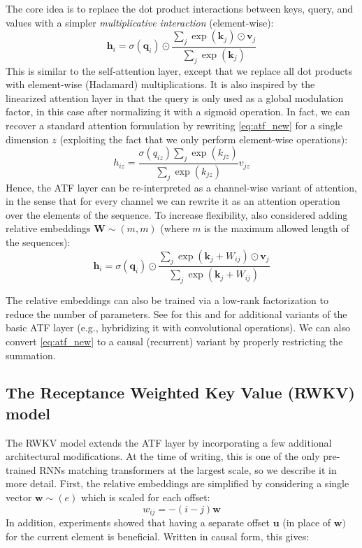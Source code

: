 The core idea is to replace the dot product interactions between keys, query, and values with a simpler \textit{multiplicative interaction} (element-wise):
%
\begin{equation}
\mathbf{h}_i=\sigma(\mathbf{q}_i) \odot\frac{\sum_j \exp\left(\mathbf{k}_j \right) \odot \mathbf{v}_j}{\sum_j\exp\left(\mathbf{k}_j \right)}
\label{eq:atf_new}
\end{equation}
%
This is similar to the self-attention layer, except that we replace all dot products with element-wise (Hadamard) multiplications. It is also inspired by the linearized attention layer in that the query is only used as a global modulation factor, in this case after normalizing it with a sigmoid operation. In fact, we can recover a standard attention formulation by rewriting \eqref{eq:atf_new} for a single dimension $z$ (exploiting the fact that we only perform element-wise operations):
%
$$
h_{iz}=\frac{\sigma(q_{iz})\sum_{j}\exp(k_{jz})}{\sum_j \exp(k_{jz})}v_{jz}
$$
%
Hence, the ATF layer can be re-interpreted as a channel-wise variant of attention, in the sense that for every channel we can rewrite it as an attention operation over the elements of the sequence. To increase flexibility, \cite{zhai2021attention} also considered adding relative embeddings $\mathbf{W} \sim (m, m)$ (where $m$ is the maximum allowed length of the sequences):
%
\begin{equation}\mathbf{h}_i=\sigma(\mathbf{q}_i) \odot\frac{\sum_j \exp\left(\mathbf{k}_j +W_{ij}\right) \odot \mathbf{v}_j}{\sum_j\exp\left(\mathbf{k}_j +W_{ij}\right)}\end{equation}

The relative embeddings can also be trained via a low-rank factorization to reduce the number of parameters. See \cite{zhai2021attention} for this and for additional variants of the basic ATF layer (e.g., hybridizing it with convolutional operations). We can also convert \eqref{eq:atf_new} to a causal (recurrent) variant by properly restricting the summation.

\subsection{The Receptance Weighted Key Value (RWKV) model}

The RWKV model \cite{peng2023rwkv} extends the ATF layer by incorporating a few additional architectural modifications. At the time of writing, this is one of the only pre-trained RNNs matching transformers at the largest scale, so we describe it in more detail. First, the relative embeddings are simplified by considering a single vector $\mathbf{w} \sim (e)$ which is scaled for each offset:
%
$$
w_{ij}=-(i-j)\mathbf{w}
$$
%
In addition, experiments showed that having a separate offset $\mathbf{u}$ (in place of $\mathbf{w})$ for the current element is beneficial. Written in causal form, this gives:

